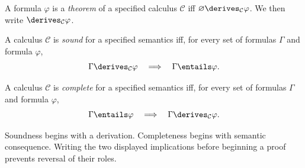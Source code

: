 \begin{definition}
A formula \(\varphi\) is a \emph{theorem} of a specified calculus
\(\mathcal C\) iff \(\varnothing\derives_{\mathcal C}\varphi\).  We then
write \(\derives_{\mathcal C}\varphi\).
\end{definition}

\begin{definition}[Soundness]
A calculus \(\mathcal C\) is \emph{sound} for a specified semantics iff, for
every set of formulas \(\Gamma\) and formula \(\varphi\),
\[
  \Gamma\derives_{\mathcal C}\varphi
  \quad\Longrightarrow\quad
  \Gamma\entails\varphi.
\]
\end{definition}

\begin{definition}[Completeness]
A calculus \(\mathcal C\) is \emph{complete} for a specified semantics iff,
for every set of formulas \(\Gamma\) and formula \(\varphi\),
\[
  \Gamma\entails\varphi
  \quad\Longrightarrow\quad
  \Gamma\derives_{\mathcal C}\varphi.
\]
\end{definition}

\begin{warning}
Soundness begins with a derivation.  Completeness begins with semantic
consequence.  Writing the two displayed implications before beginning a proof
prevents reversal of their roles.
\end{warning}


